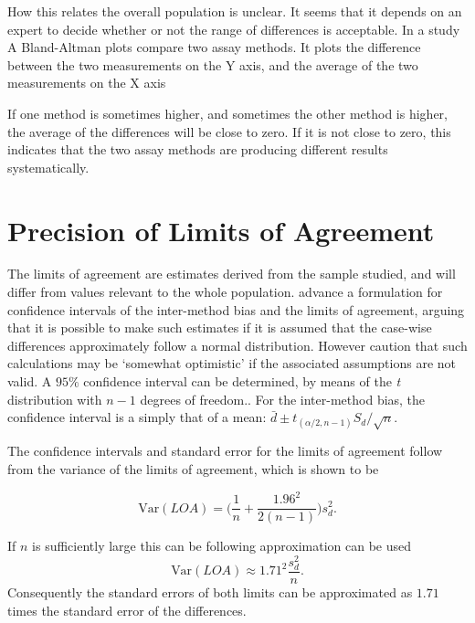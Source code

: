\documentclass[12pt, a4paper]{report}
\theoremstyle{plain}
\theoremstyle{definition}
\theoremstyle{remark}
\begin{document}
How this relates the overall population is unclear. It seems that
it depends on an expert to decide whether or not the range of
differences is acceptable. In a study A Bland-Altman plots compare
two assay methods. It plots the difference between the two
measurements on the Y axis, and the average of the two
measurements on the X axis

	
	If one method is sometimes higher, and sometimes the other method is higher, the average of the differences will be close to zero.
	If it is not close to zero, this indicates that the two assay methods are producing different results systematically.


\section{Precision of Limits of Agreement}

	The limits of agreement are estimates derived from the sample studied, and will differ from values relevant to the whole
	population. \citet*{BA86} advance a formulation for confidence
	intervals of the inter-method bias and the limits of agreement, arguing that it is possible to make such estimates if it is assumed that the case-wise differences approximately follow a normal distribution. However \citet*{BA99} caution that such calculations may be `somewhat
	optimistic' if the associated assumptions are not valid. A $95\%$ confidence interval can be determined, by means of the
	\emph{t} distribution with $n-1$ degrees of freedom.. For the inter-method bias, the confidence interval is a simply that of a mean: $\bar{d} \pm t_{(\alpha/2,n-1)} S_{d}/\sqrt{n}$.
	
	The confidence intervals and standard error for the limits of agreement follow from the variance of the limits of agreement, which is shown to be
	
	\[
	\mbox{Var}(LOA) = \bigg(\frac{1}{n}+\frac{1.96^{2}}{2(n-1)}\bigg)s_{d}^{2}.
	\]
	
	If $n$ is sufficiently large this can be following approximation can be used
	\[
	\mbox{Var}(LOA) \approx 1.71^{2}\frac{s_{d}^{2}}{n}.
	\]
	Consequently the standard errors of both limits can be approximated as $1.71$ times the standard error of the differences.
	


 


		
\end{document}
